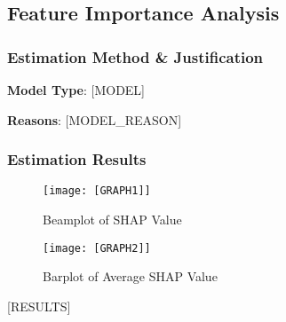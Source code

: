 \subsection{Feature Importance Analysis}

\subsubsection{Estimation Method \& Justification}

\textbf{Model Type}: [MODEL]

\textbf{Reasons}: [MODEL_REASON]


\subsubsection{Estimation Results}

\begin{minipage}[t]{0.5\linewidth}
    \begin{figure}[H]
        \centering
        \vspace{-1.5cm}
        \texttt{[image: [GRAPH1]]}
        \caption{Beamplot of SHAP Value}
    \end{figure}
\vfill
\end{minipage}
\hfill
\begin{minipage}[t]{0.5\linewidth}
    \begin{figure}[H]
        \centering
        \vspace{-1.5cm}
        \texttt{[image: [GRAPH2]]}
        \caption{Barplot of Average SHAP Value}
    \end{figure}
\end{minipage}

[RESULTS]